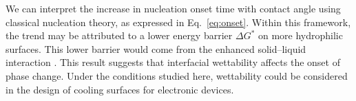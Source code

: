 We can interpret the increase in nucleation onset time with contact angle using classical nucleation theory, as expressed in Eq.~\eqref{eq:onset}. Within this framework, the trend may be attributed to a lower energy barrier $\Delta G^*$ on more hydrophilic surfaces. This lower barrier would come from the enhanced solid--liquid interaction \cite{carey2018}. This result suggests that interfacial wettability affects the onset of phase change. Under the conditions studied here, wettability could be considered in the design of cooling surfaces for electronic devices.
